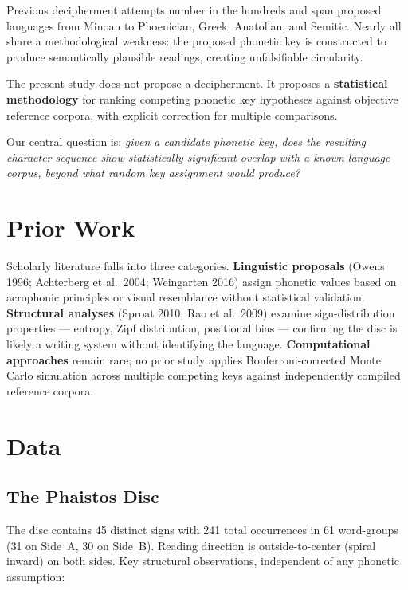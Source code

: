 \documentclass[12pt,a4paper]{article}
\begin{document}
Previous decipherment attempts number in the hundreds and span proposed languages from Minoan to Phoenician, Greek, Anatolian, and Semitic. Nearly all share a methodological weakness: the proposed phonetic key is constructed to produce semantically plausible readings, creating unfalsifiable circularity.

The present study does not propose a decipherment. It proposes a \textbf{statistical methodology} for ranking competing phonetic key hypotheses against objective reference corpora, with explicit correction for multiple comparisons.

Our central question is: \textit{given a candidate phonetic key, does the resulting character sequence show statistically significant overlap with a known language corpus, beyond what random key assignment would produce?}

\section{Prior Work}

Scholarly literature falls into three categories. \textbf{Linguistic proposals} (Owens 1996; Achterberg et al.\ 2004; Weingarten 2016) assign phonetic values based on acrophonic principles or visual resemblance without statistical validation. \textbf{Structural analyses} (Sproat 2010; Rao et al.\ 2009) examine sign-distribution properties — entropy, Zipf distribution, positional bias — confirming the disc is likely a writing system without identifying the language. \textbf{Computational approaches} remain rare; no prior study applies Bonferroni-corrected Monte Carlo simulation across multiple competing keys against independently compiled reference corpora.

\section{Data}

\subsection{The Phaistos Disc}

The disc contains 45 distinct signs with 241 total occurrences in 61 word-groups (31 on Side~A, 30 on Side~B). Reading direction is outside-to-center (spiral inward) on both sides. Key structural observations, independent of any phonetic assumption:
\end{document}
